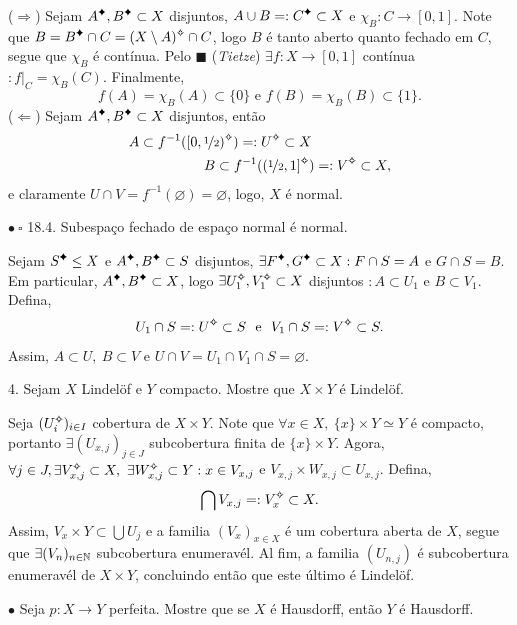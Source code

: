 \textcolor{gris}{(\(\Rightarrow\)) Sejam \(A\ce, B\ce\subset X\) disjuntos, \(A \cup B = : C\ce \subset X\) e \(\chi_{B} : C  \to [0,1] \). Note que \(B = B\ce\cap C = (X\setminus A)\ab \cap C \), logo \(B\) é tanto aberto quanto fechado em \(C\), segue que \(\chi_B\) é contínua. Pelo \(\blacksquare\) (\emph{Tietze}) \(\exists f: X\to [0,1]\) contínua \(:f|_C = \chi_B(C) \). Finalmente, 
\[f(A) = \chi_B(A) \subset \{0\} \text{ \ e \ } f(B) = \chi_B(B) \subset\{1\}.\] 
(\(\Leftarrow\)) Sejam \(A\ce, B\ce\subset X\) disjuntos, então 
\begin{align*}
A \subset f^{-1}([0,\nicefrac{1}{2})\ab)=:U\ab \subset X \hspace{2cm}\\
B \subset f^{-1}((\nicefrac{1}{2}, 1]\ab)=:V\ab \subset X,
\end{align*}
e claramente \(U\cap V = f^{-1}(\varnothing) = \varnothing\), logo, \(X\) é normal. 
}  

\(\bullet \ \square\) 18.4.  Subespaço fechado de espaço normal é normal.  

\textcolor{gris}{Sejam  \(S\ce \leq X\) e \(A\ce, B\ce\subset S\) disjuntos, \(\exists F\ce, G\ce \subset X : F\cap S = A\) e \(G\cap S = B\). Em particular, \(A\ce,B\ce \subset X\), logo \(\exists U_1\ab, V_1\ab \subset X \) disjuntos \(: A \subset U_1\) e \(B\subset V_1\). Defina, 
\[U_1 \cap S =: U\ab\subset S \text{ \ e \ } V_1 \cap S =: V\ab \subset S. \]
Assim, \(A \subset U, \ B\subset V\) e \(U \cap V = U_1 \cap V_1 \cap S =\varnothing\).
}  

4. Sejam \(X\) Lindelöf e \(Y\) compacto. Mostre que \(X\times Y \) é Lindelöf.  

\textcolor{gris}{Seja \((U_i\ab)_{i\in I}\) cobertura de \(X\times Y\). Note que \(\forall x \in X, \ \{x\} \times Y \simeq Y\) é compacto, portanto \(\exists (U_{x,j})_{j\in J}\) subcobertura finita de \(\{x\}\times Y\). Agora, \(\forall j\in J, \exists V_{x,j}\ab \subset X, \ \exists W_{x,j}\ab\subset Y : x \in V_{x,j}\) e \(V_{x,j} \times W_{x,j} \subset U_{x,j}\). Defina,  
\[\bigcap V_{x,j}=: V_x\ab \subset X . \]
Assim, \(V_x \times Y \subset \bigcup U_j\) e a familia \((V_x)_{x\in X}\) é um cobertura aberta de \(X\), segue que \(\exists (V_n)_{n \in \mathbb{N}}\) subcobertura enumeravél. Al fim, a familia \((U_{n,j})\) é subcobertura enumeravél de \(X\times Y\), concluindo então que este último é Lindelöf.     
}  

\(\bullet\) Seja \(p: X \to Y\) perfeita. Mostre que se \(X \) é Hausdorff, então \(Y \) é Hausdorff.  


